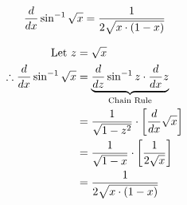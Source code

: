 \documentclass[14pt,fleqn]{extarticle}
\newcommand\fx{\sin^{-1}\sqrt{x}}
\begin{document}
 

\begin{snippet}
    \correct
    
    \[ \frac{d}{dx} \sin^{-1}\sqrt{x} = \frac{1}{2\sqrt{x\cdot \left(1-x \right)}}\]
    
    \reason
    
    \begin{align}
	\text{Let } z &= \sqrt{x} \\
	\therefore \ddx \fx  &= \underbrace{\frac{d}{dz}\sin^{-1} z\cdot \ddx z}_{\text{Chain Rule}} \\
	&= \frac{1}{\sqrt{1-z^2}}\cdot \left[\ddx\sqrt{x} \right] \\
	&= \frac{1}{\sqrt{1-x}}\cdot \left[\frac{1}{2\sqrt{x}} \right] \\
	&= \frac{1}{2\sqrt{x\cdot \left(1-x \right)}}
\end{align}
\end{snippet} 
\end{document}
